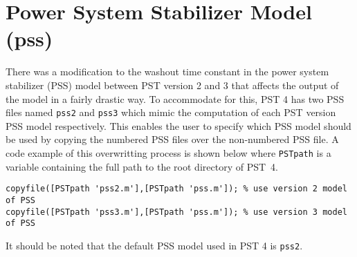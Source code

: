 \section{Power System Stabilizer Model (pss)}  
There was a modification to the washout time constant in the power system stabilizer (PSS) model between PST version 2 and 3 that affects the output of the model in a fairly drastic way.
To accommodate for this, PST 4 has two PSS files named \verb|pss2| and \verb|pss3| which mimic the computation of each PST version PSS model respectively.
This enables the user to specify which PSS model should be used by copying the numbered PSS files over the non-numbered PSS file.
A code example of this overwritting process is shown below where \verb|PSTpath| is a variable containing the full path to the root directory of \mbox{PST 4}.

\begin{verbatim}
copyfile([PSTpath 'pss2.m'],[PSTpath 'pss.m']); % use version 2 model of PSS
copyfile([PSTpath 'pss3.m'],[PSTpath 'pss.m']); % use version 3 model of PSS
\end{verbatim}

\noindent It should be noted that the default PSS model used in PST 4 is \verb|pss2|.

